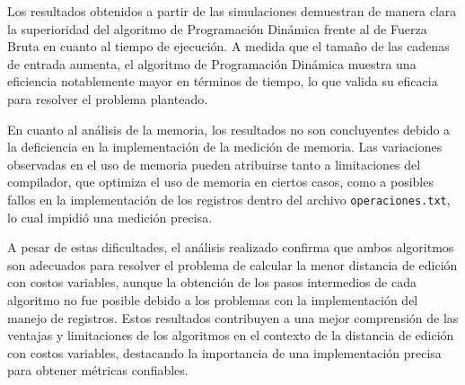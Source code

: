 Los resultados obtenidos a partir de las simulaciones demuestran de manera clara la superioridad del algoritmo de Programación Dinámica frente al de Fuerza Bruta en cuanto al tiempo de ejecución. A medida que el tamaño de las cadenas de entrada aumenta, el algoritmo de Programación Dinámica muestra una eficiencia notablemente mayor en términos de tiempo, lo que valida su eficacia para resolver el problema planteado.

En cuanto al análisis de la memoria, los resultados no son concluyentes debido a la deficiencia en la implementación de la medición de memoria. Las variaciones observadas en el uso de memoria pueden atribuirse tanto a limitaciones del compilador, que optimiza el uso de memoria en ciertos casos, como a posibles fallos en la implementación de los registros dentro del archivo \texttt{operaciones.txt}, lo cual impidió una medición precisa.

A pesar de estas dificultades, el análisis realizado confirma que ambos algoritmos son adecuados para resolver el problema de calcular la menor distancia de edición con costos variables, aunque la obtención de los pasos intermedios de cada algoritmo no fue posible debido a los problemas con la implementación del manejo de registros. Estos resultados contribuyen a una mejor comprensión de las ventajas y limitaciones de los algoritmos en el contexto de la distancia de edición con costos variables, destacando la importancia de una implementación precisa para obtener métricas confiables.
